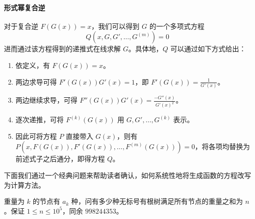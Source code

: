 \paragraph{形式幂复合逆}

对于复合逆 $F(G(x)) =x$，我们可以得到 $G$ 的一个多项式方程
$$Q(x,G,G',\dots,G^{(m)})=0$$
进而通过该方程得到的递推式在线求解 $G$。具体地，$Q$ 可以通过如下方式给出：
\begin{enumerate}
  \item 依定义，有 $F(G(x))=x$。
  \item 两边求导可得 $F'(G(x))G'(x)=1$，即 $F'(G(x))=\frac 1{G'(x)}$。
  \item 两边继续求导，可得 $F''(G(x))G'(x) = \frac{-G''(x)}{G'(x)^2}$。
  \item 逐次递推，可将 $F^{(k)}(G(x))$ 用 $G,G',\dots,G^{(k)}$ 表示。
  \item 因此可将方程 $P$ 直接带入 $G(x)$，则有 $P(x,F(G(x)),F'(G(x)),\dots,F^{(m)}(G(x))) = 0$，将各项均替换为前述式子之后通分，即得方程 $Q$。
\end{enumerate}

下面我们通过一个经典问题来帮助读者确认，如何系统性地将生成函数的方程改写为计算方法。

\begin{problem}[无标号有根树]
重量为 $k$ 的节点有 $a_k$ 种，问有多少种无标号有根树满足所有节点的重量之和为 $n$。保证 $1\le n\le 10^5$，同余 $998244353$。
\end{problem}

